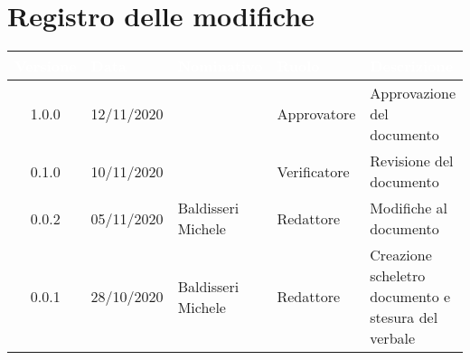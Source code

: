 \section*{Registro delle modifiche}
{
\renewcommand{\arraystretch}{1.5}
\centering
\begin{longtable}{c C{2.6cm}  C{2.6cm} C{2.6cm} C{3.5cm}}
\textcolor{white}{\textbf{Versione}}&
\textcolor{white}{\textbf{Data}}&
\textcolor{white}{\textbf{Nominativo}}&
\textcolor{white}{\textbf{Ruolo}}&
\textcolor{white}{\textbf{Descrizione}}\\	
\endhead
		
1.0.0 & 12/11/2020 & \SG{} & Approvatore & Approvazione del documento\\

0.1.0 & 10/11/2020 & \PA{} & Verificatore & Revisione del documento\\

0.0.2 & 05/11/2020 & Baldisseri Michele & Redattore & Modifiche al documento\\

0.0.1 & 28/10/2020 & Baldisseri Michele & Redattore & Creazione scheletro documento e stesura del verbale\\
		
\end{longtable}
}
